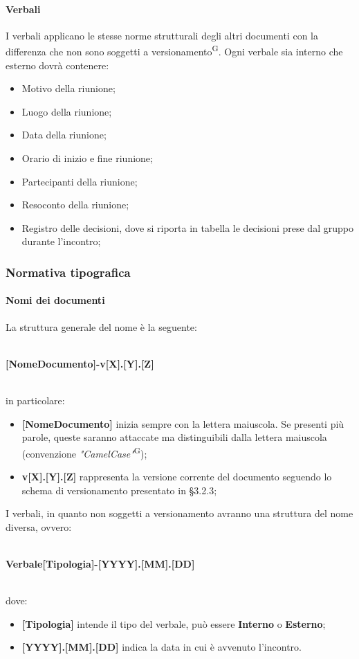\paragraph{Verbali}
I verbali applicano le stesse norme strutturali degli altri documenti con la differenza che non sono soggetti a versionamento\textsuperscript{G}. Ogni verbale sia interno che esterno dovrà contenere:
\begin{itemize}
\item Motivo della riunione;
\item Luogo della riunione;
\item Data della riunione;
\item Orario di inizio e fine riunione;
\item Partecipanti della riunione;
\item Resoconto della riunione;
\item Registro delle decisioni, dove si riporta in tabella le decisioni prese dal gruppo durante l’incontro;
\end{itemize}  		

\subsubsection{Normativa tipografica}
\paragraph{Nomi dei documenti}
La struttura generale del nome è la seguente: \\ \\
\centerline{\textbf{[NomeDocumento]-v[X].[Y].[Z]}}\\
in particolare:
\begin{itemize}
\item \textbf{[NomeDocumento]} inizia sempre con la lettera maiuscola. Se presenti più parole, queste saranno attaccate ma distinguibili dalla lettera maiuscola (convenzione \textit{"CamelCase"}\textsuperscript{G});
\item \textbf{v[X].[Y].[Z]} rappresenta la versione corrente del documento seguendo lo schema di versionamento presentato in §3.2.3;
\end{itemize}
I verbali, in quanto non soggetti a versionamento avranno una struttura del nome diversa, ovvero:\\ \\
\centerline{\textbf{Verbale[Tipologia]-[YYYY].[MM].[DD]}} \\
dove:
\begin{itemize}
\item \textbf{[Tipologia]} intende il tipo del verbale, può essere \textbf{Interno} o \textbf{Esterno};
\item \textbf{[YYYY].[MM].[DD]} indica la data in cui è avvenuto l'incontro.
\end{itemize}



